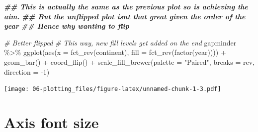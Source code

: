 \documentclass[
]{book}
\newenvironment{Shaded}{\begin{snugshade}}{\end{snugshade}}
\newcommand{\AttributeTok}[1]{\textcolor[rgb]{0.77,0.63,0.00}{#1}}
\newcommand{\CommentTok}[1]{\textcolor[rgb]{0.56,0.35,0.01}{\textit{#1}}}
\newcommand{\DecValTok}[1]{\textcolor[rgb]{0.00,0.00,0.81}{#1}}
\newcommand{\DocumentationTok}[1]{\textcolor[rgb]{0.56,0.35,0.01}{\textbf{\textit{#1}}}}
\newcommand{\FunctionTok}[1]{\textcolor[rgb]{0.00,0.00,0.00}{#1}}
\newcommand{\NormalTok}[1]{#1}
\newcommand{\SpecialCharTok}[1]{\textcolor[rgb]{0.00,0.00,0.00}{#1}}
\newcommand{\StringTok}[1]{\textcolor[rgb]{0.31,0.60,0.02}{#1}}
\begin{document}
\begin{Shaded}
\begin{Highlighting}[]
\DocumentationTok{\#\# This is actually the same as the previous plot so is achieving the aim. }
\DocumentationTok{\#\# But the unflipped plot isn\textquotesingle{}t that great given the order of the year}
\DocumentationTok{\#\# Hence why wanting to flip}

\CommentTok{\# Better flipped}
\CommentTok{\# This way, new fill levels get added on the end}
\NormalTok{gapminder }\SpecialCharTok{\%\textgreater{}\%} 
  \FunctionTok{ggplot}\NormalTok{(}\FunctionTok{aes}\NormalTok{(}\AttributeTok{x =} \FunctionTok{fct\_rev}\NormalTok{(continent), }\AttributeTok{fill =} \FunctionTok{fct\_rev}\NormalTok{(}\FunctionTok{factor}\NormalTok{(year)))) }\SpecialCharTok{+} 
  \FunctionTok{geom\_bar}\NormalTok{() }\SpecialCharTok{+} 
  \FunctionTok{coord\_flip}\NormalTok{() }\SpecialCharTok{+} 
  \FunctionTok{scale\_fill\_brewer}\NormalTok{(}\AttributeTok{palette =} \StringTok{"Paired"}\NormalTok{, }\AttributeTok{breaks =}\NormalTok{ rev, }\AttributeTok{direction =} \SpecialCharTok{{-}}\DecValTok{1}\NormalTok{)}
\end{Highlighting}
\end{Shaded}

\texttt{[image: 06-plotting\_files/figure-latex/unnamed-chunk-1-3.pdf]}

\hypertarget{axis-font-size}{%
\section{Axis font size}\label{axis-font-size}}
\end{document}
